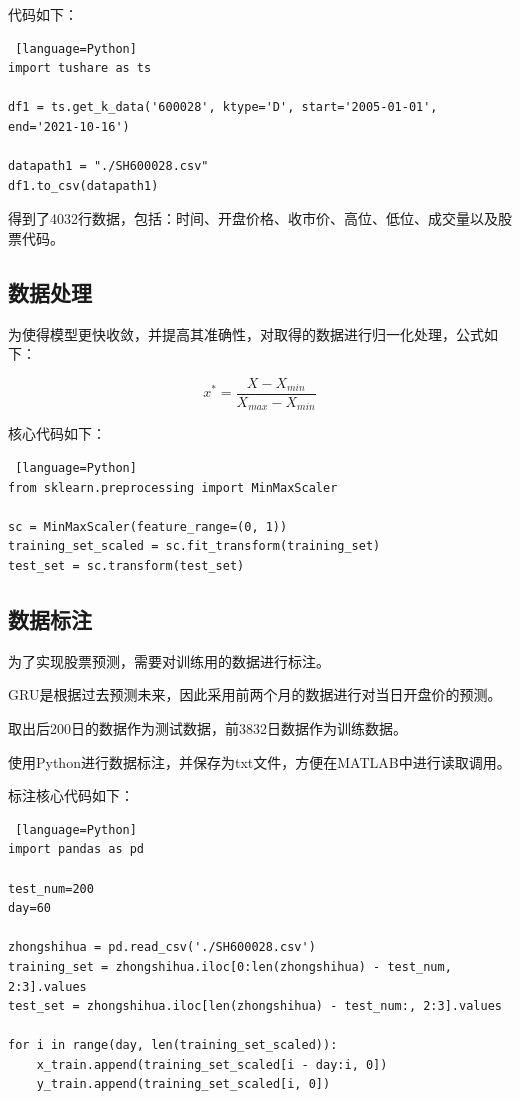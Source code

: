\documentclass{jnuthesis}
\begin{document}
代码如下：

\begin{lstlisting} [language=Python]
import tushare as ts

df1 = ts.get_k_data('600028', ktype='D', start='2005-01-01', end='2021-10-16')

datapath1 = "./SH600028.csv"
df1.to_csv(datapath1)
\end{lstlisting}

得到了4032行数据，包括：时间、开盘价格、收市价、高位、低位、成交量以及股票代码。

\subsection{数据处理}

为使得模型更快收敛，并提高其准确性，对取得的数据进行归一化处理，公式如下：

\begin{equation}
x^*=\frac{X-X_{min}}{X_{max}-X_{min}}
\end{equation}


核心代码如下：
\begin{lstlisting} [language=Python]
from sklearn.preprocessing import MinMaxScaler

sc = MinMaxScaler(feature_range=(0, 1))  
training_set_scaled = sc.fit_transform(training_set)
test_set = sc.transform(test_set)
\end{lstlisting}

\subsection{数据标注}

为了实现股票预测，需要对训练用的数据进行标注。

GRU是根据过去预测未来，因此采用前两个月的数据进行对当日开盘价的预测。

取出后200日的数据作为测试数据，前3832日数据作为训练数据。

使用Python进行数据标注，并保存为txt文件，方便在MATLAB中进行读取调用。

标注核心代码如下：
\begin{lstlisting} [language=Python]
import pandas as pd

test_num=200
day=60

zhongshihua = pd.read_csv('./SH600028.csv')  
training_set = zhongshihua.iloc[0:len(zhongshihua) - test_num, 2:3].values
test_set = zhongshihua.iloc[len(zhongshihua) - test_num:, 2:3].values

for i in range(day, len(training_set_scaled)):  
	x_train.append(training_set_scaled[i - day:i, 0])
	y_train.append(training_set_scaled[i, 0])
\end{lstlisting}
\end{document}
